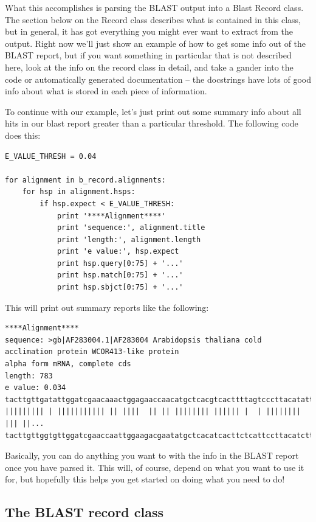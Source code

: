 \documentclass{report}
\begin{document}
What this accomplishes is parsing the BLAST output into a Blast Record class. The section below on the Record class describes what is contained in this class, but in general, it has got everything you might ever want to extract from the output. Right now we'll just show an example of how to get some info out of the BLAST report, but if you want something in particular that is not described here, look at the info on the record class in detail, and take a gander into the code or automatically generated documentation -- the docstrings have lots of good info about what is stored in each piece of information.


To continue with our example, let's just print out some summary info about all hits in our blast report greater than a particular threshold. The following code does this:

\begin{verbatim}
E_VALUE_THRESH = 0.04

for alignment in b_record.alignments:
    for hsp in alignment.hsps:
        if hsp.expect < E_VALUE_THRESH:
            print '****Alignment****'
            print 'sequence:', alignment.title
            print 'length:', alignment.length
            print 'e value:', hsp.expect
            print hsp.query[0:75] + '...'
            print hsp.match[0:75] + '...'
            print hsp.sbjct[0:75] + '...'
\end{verbatim}

This will print out summary reports like the following:

\begin{verbatim}
****Alignment****
sequence: >gb|AF283004.1|AF283004 Arabidopsis thaliana cold acclimation protein WCOR413-like protein
alpha form mRNA, complete cds
length: 783
e value: 0.034
tacttgttgatattggatcgaacaaactggagaaccaacatgctcacgtcacttttagtcccttacatattcctc...
||||||||| | ||||||||||| || ||||  || || |||||||| |||||| |  | |||||||| ||| ||...
tacttgttggtgttggatcgaaccaattggaagacgaatatgctcacatcacttctcattccttacatcttcttc...
\end{verbatim}

Basically, you can do anything you want to with the info in the BLAST report once you have parsed it. This will, of course, depend on what you want to use it for, but hopefully this helps you get started on doing what you need to do!

\subsection{The BLAST record class}
\end{document}
